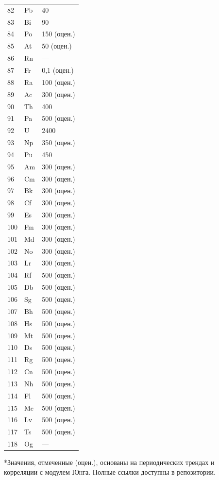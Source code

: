 \documentclass[12pt,a4paper]{article}
\begin{document}
\begin{longtable}{p{0.6cm}p{1.2cm}p{2.5cm}}
		82 & Pb & 40 \\
		83 & Bi & 90 \\
		84 & Po & 150 (оцен.) \\
		85 & At & 50 (оцен.) \\
		86 & Rn & — \\
		87 & Fr & 0,1 (оцен.) \\
		88 & Ra & 100 (оцен.) \\
		89 & Ac & 300 (оцен.) \\
		90 & Th & 400 \\
		91 & Pa & 500 (оцен.) \\
		92 & U  & 2400 \\
		93 & Np & 350 (оцен.) \\
		94 & Pu & 450 \\
		95 & Am & 300 (оцен.) \\
		96 & Cm & 300 (оцен.) \\
		97 & Bk & 300 (оцен.) \\
		98 & Cf & 300 (оцен.) \\
		99 & Es & 300 (оцен.) \\
		100& Fm & 300 (оцен.) \\
		101& Md & 300 (оцен.) \\
		102& No & 300 (оцен.) \\
		103& Lr & 300 (оцен.) \\
		104& Rf & 500 (оцен.) \\
		105& Db & 500 (оцен.) \\
		106& Sg & 500 (оцен.) \\
		107& Bh & 500 (оцен.) \\
		108& Hs & 500 (оцен.) \\
		109& Mt & 500 (оцен.) \\
		110& Ds & 500 (оцен.) \\
		111& Rg & 500 (оцен.) \\
		112& Cn & 500 (оцен.) \\
		113& Nh & 500 (оцен.) \\
		114& Fl & 500 (оцен.) \\
		115& Mc & 500 (оцен.) \\
		116& Lv & 500 (оцен.) \\
		117& Ts & 500 (оцен.) \\
		118& Og & — \\
		\bottomrule
	\end{longtable}
	*Значения, отмеченные (оцен.), основаны на периодических трендах и корреляции с модулем Юнга. Полные ссылки доступны в репозитории.
	
\end{document}
